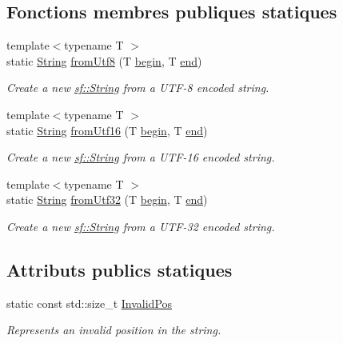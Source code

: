 \subsection*{Fonctions membres publiques statiques}
\begin{DoxyCompactItemize}
\item 
{\footnotesize template$<$typename T $>$ }\\static \hyperlink{classsf_1_1String}{String} \hyperlink{classsf_1_1String_aa7beb7ae5b26e63dcbbfa390e27a9e4b}{from\+Utf8} (T \hyperlink{classsf_1_1String_a8ec30ddc08e3a6bd11c99aed782f6dfe}{begin}, T \hyperlink{classsf_1_1String_ac823012f39cb6f61100418876e99d53b}{end})
\begin{DoxyCompactList}\small\item\em Create a new \hyperlink{classsf_1_1String}{sf\+::\+String} from a U\+T\+F-\/8 encoded string. \end{DoxyCompactList}\item 
{\footnotesize template$<$typename T $>$ }\\static \hyperlink{classsf_1_1String}{String} \hyperlink{classsf_1_1String_a81f70eecad0000a4f2e4d66f97b80300}{from\+Utf16} (T \hyperlink{classsf_1_1String_a8ec30ddc08e3a6bd11c99aed782f6dfe}{begin}, T \hyperlink{classsf_1_1String_ac823012f39cb6f61100418876e99d53b}{end})
\begin{DoxyCompactList}\small\item\em Create a new \hyperlink{classsf_1_1String}{sf\+::\+String} from a U\+T\+F-\/16 encoded string. \end{DoxyCompactList}\item 
{\footnotesize template$<$typename T $>$ }\\static \hyperlink{classsf_1_1String}{String} \hyperlink{classsf_1_1String_ab023a4900dce37ee71ab9e29b30a23cb}{from\+Utf32} (T \hyperlink{classsf_1_1String_a8ec30ddc08e3a6bd11c99aed782f6dfe}{begin}, T \hyperlink{classsf_1_1String_ac823012f39cb6f61100418876e99d53b}{end})
\begin{DoxyCompactList}\small\item\em Create a new \hyperlink{classsf_1_1String}{sf\+::\+String} from a U\+T\+F-\/32 encoded string. \end{DoxyCompactList}\end{DoxyCompactItemize}
\subsection*{Attributs publics statiques}
\begin{DoxyCompactItemize}
\item 
\mbox{\label{classsf_1_1String_abaadecaf12a6b41c54d725c75fd28527}} 
static const std\+::size\+\_\+t \hyperlink{classsf_1_1String_abaadecaf12a6b41c54d725c75fd28527}{Invalid\+Pos}
\begin{DoxyCompactList}\small\item\em Represents an invalid position in the string. \end{DoxyCompactList}\end{DoxyCompactItemize}
